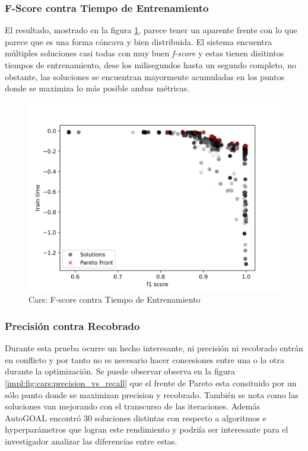 \subsubsection{F-Score contra Tiempo de Entrenamiento}
El resultado, mostrado en la figura \ref{impl:fig:cars:fscore_vs_time}, parece tener un aparente frente con lo que parece que es una forma c\'oncava y  bien distribuida.  El sistema encuentra m\'ultiples soluciones   casi todas con muy buen \textit{f-score} y estas tienen disitintos tiempos de entrenamiento, dese los milisegundos hasta un segundo completo, no obstante, las soluciones se encuentran mayormente acumuladas en los puntos donde se maximiza lo m\'as posible ambas m\'etricas.

\begin{figure}[ht]
    \centering
    \includegraphics[scale=0.65]{Pictures/cars_fscore_vs_time.jpg}
    \caption{Cars: F-score contra Tiempo de Entrenamiento}
    \label{impl:fig:cars:fscore_vs_time}
\end{figure}


\subsubsection{Precisi\'on contra Recobrado}
Durante esta prueba ocurre un hecho interesante, ni precisi\'on ni recobrado entr\'an en conflicto y por tanto no es necesario hacer concesiones entre una o la otra durante la optimizaci\'on. Se puede observar observa en la figura \ref{impl:fig:cars:precision_vs_recall} que el frente de Pareto esta consituido por un s\'olo punto donde se maximizan precision y recobrado. Tambi\'en se nota como las soluciones van mejorando con el transcurso de las iteraciones.
Adem\'as AutoGOAL encontr\'o 30 soluciones distintas con respecto a algoritmos e hyperpar\'ametros que logran este rendimiento y podri\'ia ser interesante para el investigador analizar las diferencias entre estas.

